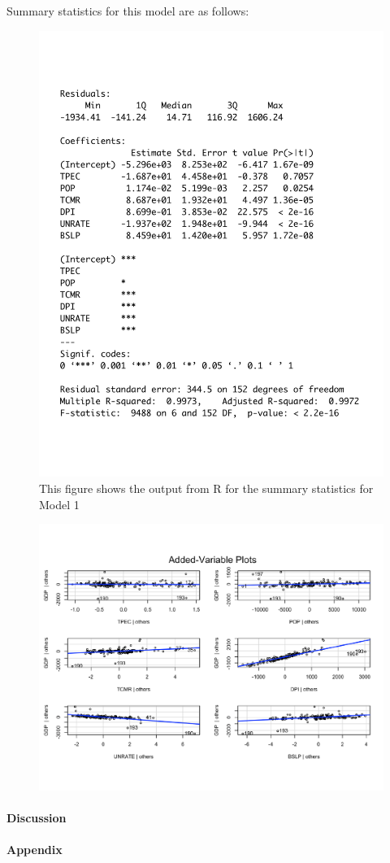 \documentclass[12pt]{article}
\begin{document}
Summary statistics for this model are as follows:

\begin{figure}[H]
  \centering
  \includegraphics[width = \textwidth]{mod1output}
  \caption{This figure shows the output from R for the summary statistics for Model 1}
\end{figure}





\begin{figure}[h]
  \centering
  \includegraphics[width=\textwidth]{AVP1}
\end{figure}


\paragraph{Discussion}


\paragraph{Appendix}




\end{document}
